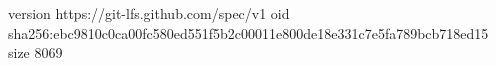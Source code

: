 version https://git-lfs.github.com/spec/v1
oid sha256:ebc9810c0ca00fc580ed551f5b2c00011e800de18e331c7e5fa789bcb718ed15
size 8069
